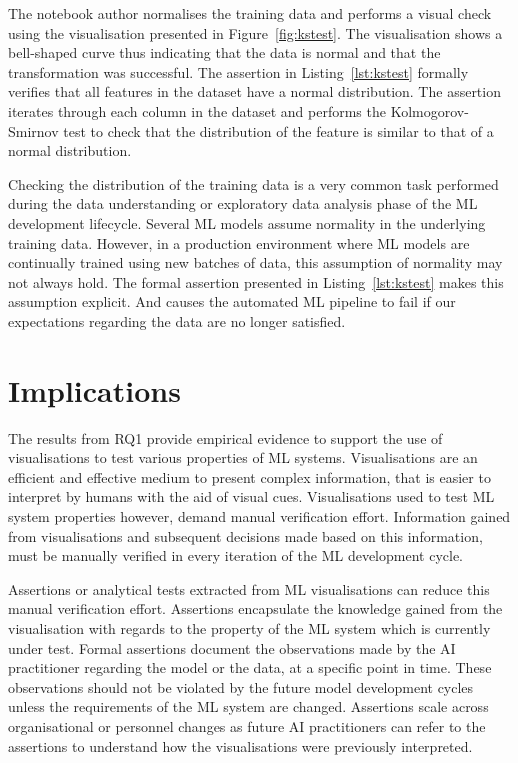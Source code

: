\documentclass[conference]{IEEEtran}
\begin{document}
The notebook author normalises the training data and performs a visual check using the visualisation presented in Figure~\ref{fig:kstest}. The visualisation shows a bell-shaped curve thus indicating that the data is normal and that the transformation was successful. The assertion in Listing~\ref{lst:kstest} formally verifies that all features in the dataset have a normal distribution. The assertion iterates through each column in the dataset and performs the Kolmogorov-Smirnov test to check that the distribution of the feature is similar to that of a normal distribution.

Checking the distribution of the training data is a very common task performed during the data understanding or exploratory data analysis phase of the ML development lifecycle. Several ML models assume normality in the underlying training data. However, in a production environment where ML models are continually trained using new batches of data, this assumption of normality may not always hold. The formal assertion presented in Listing~\ref{lst:kstest} makes this assumption explicit. And causes the automated ML pipeline to fail if our expectations regarding the data are no longer satisfied.

\section{Implications}\label{sec:discuss}

The results from RQ1 provide empirical evidence to support the use of visualisations to test various properties of ML systems. Visualisations are an efficient and effective medium to present complex information, that is easier to interpret by humans with the aid of visual cues. Visualisations used to test ML system properties however, demand manual verification effort. Information gained from visualisations and subsequent decisions made based on this information, must be manually verified in every iteration of the ML development cycle.


Assertions or analytical tests extracted from ML visualisations can reduce this manual verification effort. Assertions encapsulate the knowledge gained from the visualisation with regards to the property of the ML system which is currently under test. Formal assertions document the observations made by the AI practitioner regarding the model or the data, at a specific point in time. These observations should not be violated by the future model development cycles unless the requirements of the ML system are changed. Assertions scale across organisational or personnel changes as future AI practitioners can refer to the assertions to understand how the visualisations were previously interpreted.
\end{document}
